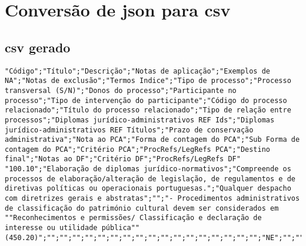 \section{Conversão de \acrshort{json} para \acrshort{csv}}\label{conv:jsonTOcsv}

\subsection{\acrshort{csv} gerado}
\begin{lstlisting}[language=pseudocode, caption=\acrshort{csv} resultante da conversão do \acrshort{json} presente em~\ref{exem:json}]
"Código";"Título";"Descrição";"Notas de aplicação";"Exemplos de NA";"Notas de exclusão";"Termos Indice";"Tipo de processo";"Processo transversal (S/N)";"Donos do processo";"Participante no processo";"Tipo de intervenção do participante";"Código do processo relacionado";"Título do processo relacionado";"Tipo de relação entre processos";"Diplomas jurídico-administrativos REF Ids";"Diplomas jurídico-administrativos REF Títulos";"Prazo de conservação administrativa";"Nota ao PCA";"Forma de contagem do PCA";"Sub Forma de contagem do PCA";"Critério PCA";"ProcRefs/LegRefs PCA";"Destino final";"Notas ao DF";"Critério DF";"ProcRefs/LegRefs DF"
"100.10";"Elaboração de diplomas jurídico-normativos";"Compreende os processos de elaboração/alteração de legislação, de regulamentos e de diretivas políticas ou operacionais portuguesas.";"Qualquer despacho com diretrizes gerais e abstratas";"";"- Procedimentos administrativos de classificação do património cultural devem ser considerados em ""Reconhecimentos e permissões/ Classificação e declaração de interesse ou utilidade pública"" (450.20)";"";"";"";"";"";"";"";"";"";"";"";"";"";"";"";"";"";"NE";"";"";""
\end{lstlisting}
